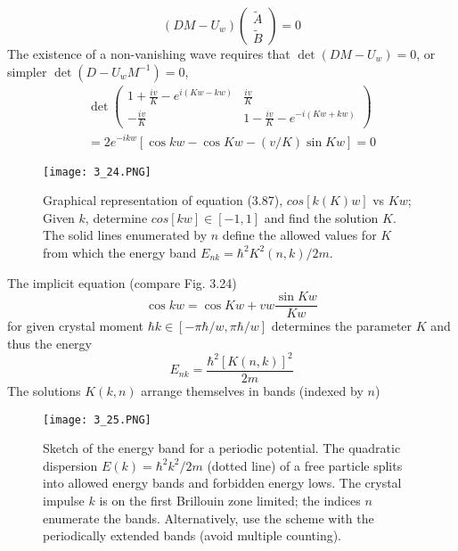 \begin{equation}
\left(D M-U_{w}\right)\left(\begin{array}{c}{\tilde{A}} \\ {\tilde{B}}\end{array}\right)=0
\end{equation}
The existence of a non-vanishing wave requires that $\operatorname{det} (DM-U_w) = 0$, or simpler $\operatorname{det} (D-U_wM^{-1}) = 0$,
%
\begin{equation}
\begin{array}{c}{\operatorname{det}\left(\begin{array}{cc}{1+\frac{i v}{K}-e^{i(K w-k w)}} & {\frac{i v}{K}} \\ {-\frac{i v}{K}} & {1-\frac{i v}{K}-e^{-i(K w+k w)}}\end{array}\right)} \\ {=2 e^{-i k w}[\cos k w-\cos K w-(v / K) \sin K w]=0}\end{array}
\end{equation}
\begin{figure}[ht]
    \begin{minipage}{0.5\textwidth}
        \centering
        \texttt{[image: 3\_24.PNG]}
    \end{minipage}
    \begin{minipage}{0.5\textwidth}
        \caption{Graphical representation of equation (3.87), $cos [k (K) w]$ vs $Kw$; Given $k$, determine $cos [kw] \in [-1, 1]$ and find the solution $K$. The solid lines enumerated by $n$ define the allowed values for $K$ from which the energy band $E_{nk}=\hbar^2K^2(n,k)/2m$.}
    \end{minipage}
\end{figure}
The implicit equation (compare Fig. 3.24)
\begin{equation}
    \cos k w=\cos K w+v w \frac{\sin K w}{K w}
    \end{equation}
for given crystal moment $\hbar k \in [-\pi \hbar / w, \pi \hbar / w]$ determines the parameter $K$ and thus the energy
\begin{equation}
    E_{n k}=\frac{\hbar^{2}[K(n, k)]^{2}}{2 m}
    \end{equation}
The solutions $K (k, n)$ arrange themselves in bands (indexed by $n$)
\begin{figure}[ht]
    \begin{minipage}{0.5\textwidth}
        \centering
        \texttt{[image: 3\_25.PNG]}
    \end{minipage}
    \begin{minipage}{0.5\textwidth}
        \caption{Sketch of the energy band for a periodic potential. The quadratic dispersion $E(k)=\hbar^2k^2/2m$ (dotted line) of a free particle splits into allowed energy bands and forbidden energy lows. The crystal impulse $k$ is on the first Brillouin zone limited; the indices $n$ enumerate the bands. Alternatively, use the scheme with the periodically extended bands (avoid multiple counting).}
    \end{minipage}
\end{figure}
